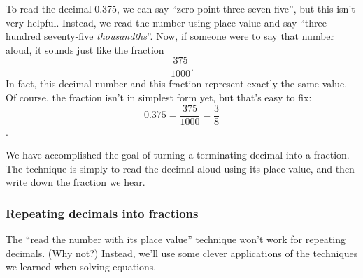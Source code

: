 \begin{center}
\end{center}

To read the decimal 0.375, we can say ``zero point three seven five'', but this isn't very helpful. Instead, we read the number using place value and say ``three hundred seventy-five \textit{thousandths}''. Now, if someone were to say that number aloud, it sounds just like the fraction \[\frac{375}{1000}.\] In fact, this decimal number and this fraction represent exactly the same value. Of course, the fraction isn't in simplest form yet, but that's easy to fix: \[0.375 = \frac{375}{1000} = \frac{3}{8}\].

We have accomplished the goal of turning a terminating decimal into a fraction. The technique is simply to read the decimal aloud using its place value, and then write down the fraction we hear.

\subsubsection{Repeating decimals into fractions}

The ``read the number with its place value'' technique won't work for repeating decimals. (Why not?) Instead, we'll use some clever applications of the techniques we learned when solving equations.

